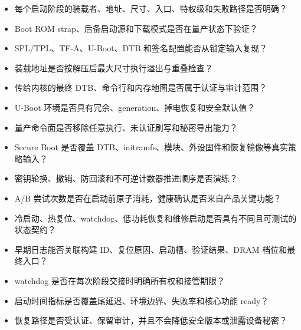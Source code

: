 \begin{itemize}
  \item 每个启动阶段的装载者、地址、尺寸、入口、特权级和失败路径是否明确？
  \item Boot ROM strap、后备启动源和下载模式是否在量产状态下验证？
  \item SPL/TPL、TF-A、U-Boot、DTB 和签名配置能否从锁定输入复现？
  \item 装载地址是否按解压后最大尺寸执行溢出与重叠检查？
  \item 传给内核的最终 DTB、命令行和内存地图是否属于认证与审计范围？
  \item U-Boot 环境是否具有冗余、generation、掉电恢复和安全默认值？
  \item 量产命令面是否移除任意执行、未认证刷写和秘密导出能力？
  \item Secure Boot 是否覆盖 DTB、initramfs、模块、外设固件和恢复镜像等真实策略输入？
  \item 密钥轮换、撤销、防回滚和不可逆计数器推进顺序是否演练？
  \item A/B 尝试次数是否在启动前原子消耗，健康确认是否来自产品关键功能？
  \item 冷启动、热复位、watchdog、低功耗恢复和维修启动是否具有不同且可测试的状态契约？
  \item 早期日志能否关联构建 ID、复位原因、启动槽、验证结果、DRAM 档位和最终入口？
  \item watchdog 是否在每次阶段交接时明确所有权和接管期限？
  \item 启动时间指标是否覆盖尾延迟、环境边界、失败率和核心功能 ready？
  \item 恢复路径是否受认证、保留审计，并且不会降低安全版本或泄露设备秘密？
\end{itemize}
